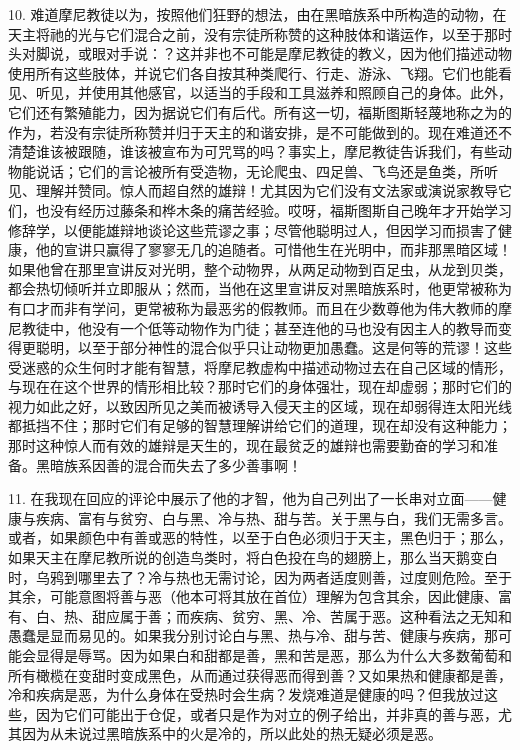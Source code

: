 10. 难道摩尼教徒以为，按照他们狂野的想法，由在黑暗族系中所构造的动物，在天主将祂的光与它们混合之前，没有宗徒所称赞的这种肢体和谐运作，以至于那时头对脚说，或眼对手说：？这并非也不可能是摩尼教徒的教义，因为他们描述动物使用所有这些肢体，并说它们各自按其种类爬行、行走、游泳、飞翔。它们也能看见、听见，并使用其他感官，以适当的手段和工具滋养和照顾自己的身体。此外，它们还有繁殖能力，因为据说它们有后代。所有这一切，福斯图斯轻蔑地称之为的作为，若没有宗徒所称赞并归于天主的和谐安排，是不可能做到的。现在难道还不清楚谁该被跟随，谁该被宣布为可咒骂的吗？事实上，摩尼教徒告诉我们，有些动物能说话；它们的言论被所有受造物，无论爬虫、四足兽、飞鸟还是鱼类，所听见、理解并赞同。惊人而超自然的雄辩！尤其因为它们没有文法家或演说家教导它们，也没有经历过藤条和桦木条的痛苦经验。哎呀，福斯图斯自己晚年才开始学习修辞学，以便能雄辩地谈论这些荒谬之事；尽管他聪明过人，但因学习而损害了健康，他的宣讲只赢得了寥寥无几的追随者。可惜他生在光明中，而非那黑暗区域！如果他曾在那里宣讲反对光明，整个动物界，从两足动物到百足虫，从龙到贝类，都会热切倾听并立即服从；然而，当他在这里宣讲反对黑暗族系时，他更常被称为有口才而非有学问，更常被称为最恶劣的假教师。而且在少数尊他为伟大教师的摩尼教徒中，他没有一个低等动物作为门徒；甚至连他的马也没有因主人的教导而变得更聪明，以至于部分神性的混合似乎只让动物更加愚蠢。这是何等的荒谬！这些受迷惑的众生何时才能有智慧，将摩尼教虚构中描述动物过去在自己区域的情形，与现在在这个世界的情形相比较？那时它们的身体强壮，现在却虚弱；那时它们的视力如此之好，以致因所见之美而被诱导入侵天主的区域，现在却弱得连太阳光线都抵挡不住；那时它们有足够的智慧理解讲给它们的道理，现在却没有这种能力；那时这种惊人而有效的雄辩是天生的，现在最贫乏的雄辩也需要勤奋的学习和准备。黑暗族系因善的混合而失去了多少善事啊！\par

11. 在我现在回应的评论中展示了他的才智，他为自己列出了一长串对立面——健康与疾病、富有与贫穷、白与黑、冷与热、甜与苦。关于黑与白，我们无需多言。或者，如果颜色中有善或恶的特性，以至于白色必须归于天主，黑色归于；那么，如果天主在摩尼教所说的创造鸟类时，将白色投在鸟的翅膀上，那么当天鹅变白时，乌鸦到哪里去了？冷与热也无需讨论，因为两者适度则善，过度则危险。至于其余，可能意图将善与恶（他本可将其放在首位）理解为包含其余，因此健康、富有、白、热、甜应属于善；而疾病、贫穷、黑、冷、苦属于恶。这种看法之无知和愚蠢是显而易见的。如果我分别讨论白与黑、热与冷、甜与苦、健康与疾病，那可能会显得是辱骂。因为如果白和甜都是善，黑和苦是恶，那么为什么大多数葡萄和所有橄榄在变甜时变成黑色，从而通过获得恶而得到善？又如果热和健康都是善，冷和疾病是恶，为什么身体在受热时会生病？发烧难道是健康的吗？但我放过这些，因为它们可能出于仓促，或者只是作为对立的例子给出，并非真的善与恶，尤其因为从未说过黑暗族系中的火是冷的，所以此处的热无疑必须是恶。\par

